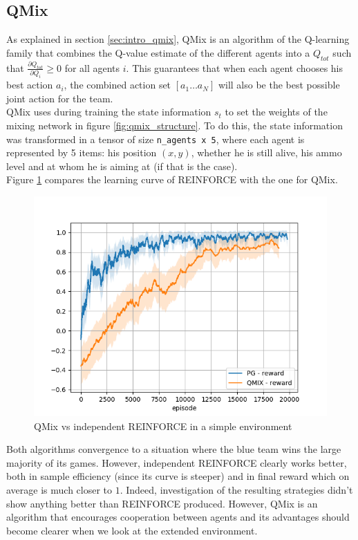 \subsection{QMix}
\label{sec:init_model_qmix}
As explained in section \ref{sec:intro_qmix}, QMix is an algorithm of the Q-learning family that combines the Q-value estimate of the different agents into a $Q_{tot}$ such that $\frac{\partial Q_{tot}}{\partial Q_i} \geq 0$ for all agents $i$. This guarantees that when each agent chooses his best action $a_i$, the combined action set $[a_1 \ldots a_N]$ will also be the best possible joint action for the team.\\
QMix uses during training the state information $s_t$ to set the weights of the mixing network in figure \ref{fig:qmix_structure}. To do this, the state information was transformed in a tensor of size {\tt n\_agents x 5}, where each agent is represented by 5 items: his position $(x, y)$, whether he is still alive, his ammo level and at whom he is aiming at (if that is the case).\\
Figure \ref{fig:comp_qmix_pg} compares the learning curve of REINFORCE with the one for QMix.
\begin{figure}[htp]
    \centering
    \includegraphics[width=14cm]{images/experiment5/pg_v_qmix_simple.png}
    \caption{QMix vs independent REINFORCE in a simple environment}
    \label{fig:comp_qmix_pg}
\end{figure}
Both algorithms convergence to a situation where the blue team wins the large majority of its games. However, independent REINFORCE clearly works better, both in sample efficiency (since its curve is steeper) and in final reward which on average is much closer to $1$. Indeed, investigation of the resulting strategies didn't show anything better than REINFORCE produced. However, QMix is an algorithm that encourages cooperation between agents and its advantages should become clearer when we look at the extended environment.\\
